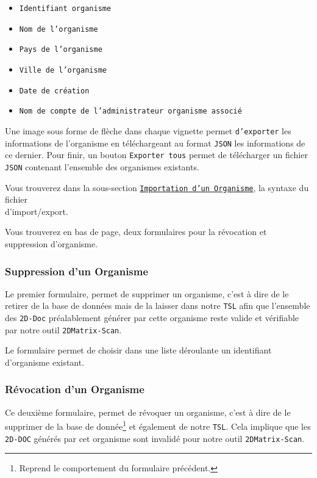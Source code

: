 \begin{itemize}
    \item \texttt{Identifiant organisme}
    \item \texttt{Nom de l'organisme}
    \item \texttt{Pays de l'organisme}
    \item \texttt{Ville de l'organisme}
    \item \texttt{Date de création }
    \item \texttt{Nom de compte de l'administrateur organisme associé}
\end{itemize}

Une image sous forme de flèche dans chaque vignette permet \texttt{d'exporter} les informations de l'organisme en téléchargeant au format \texttt{JSON} les informations de ce dernier. Pour finir, un bouton \texttt{Exporter tous} permet de télécharger un fichier \texttt{JSON} contenant l'ensemble des organismes existants.

Vous trouverez dans la sous-section \hyperref[import]{\texttt{Importation d'un Organisme}}, la syntaxe du fichier \\d'import/export.

Vous trouverez en bas de page, deux formulaires pour la révocation et suppression d'organisme.
\subsubsection{Suppression d'un Organisme}
Le premier formulaire, permet de supprimer un organisme, c'est à dire de le retirer de la base de données mais de la laisser dans notre \texttt{TSL} afin que l'ensemble des \texttt{2D-Doc} préalablement générer par cette organisme reste valide et vérifiable par notre outil \texttt{2DMatrix-Scan}. 

Le formulaire permet de choisir dans une liste déroulante un identifiant d'organisme existant.

\subsubsection{Révocation d'un Organisme}

Ce deuxième formulaire, permet de révoquer un organisme, c'est à dire de le supprimer de la base de donnée\footnote{Reprend le comportement du formulaire précédent.} et également de notre \texttt{TSL}. Cela implique que les \texttt{2D-DOC} générés par cet organisme sont invalidé pour notre outil \texttt{2DMatrix-Scan}.

